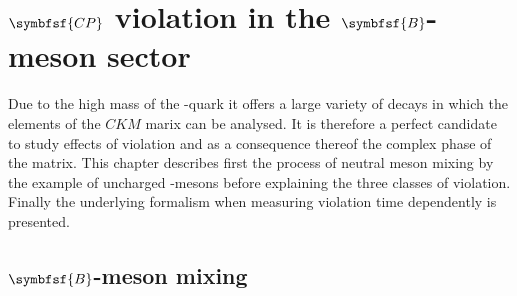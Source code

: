 \chapter[head={\CP violation in the $B$-meson sector},tocentry={$\symbfsf{C{}P}$ violation in the $\symbfsf{B}$-meson sector}]
{$\symbfsf{C{}P}$ violation in the $\symbfsf{B}$-meson sector}
\label{chap:CPV}

Due to the high mass of the \bquark-quark it offers a large variety of decays in which the elements of the $CKM$ marix can be analysed.
It is therefore a perfect candidate to study effects of \CP violation and as a consequence thereof the complex phase of the matrix. This
chapter describes first the process of neutral meson mixing by the example of uncharged \B-mesons before explaining the
three classes of \CP violation. Finally the underlying formalism when measuring \CP violation time dependently is presented.

\section[head={$B$-meson mixing},tocentry={$B$-meson mixing}]{$\symbfsf{B}$-meson mixing}
\label{sec:Bmixing}

